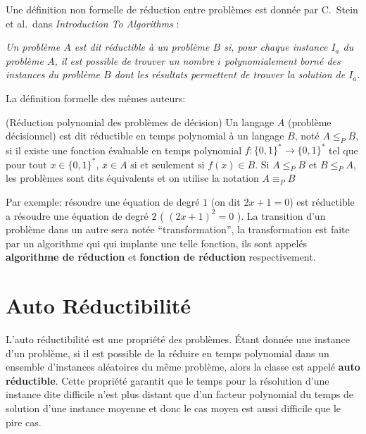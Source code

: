 Une définition non formelle de réduction entre problèmes est donnée par C.~Stein et al.~dans {\em Introduction To
  Algorithms} \cite{stein2001introduction}: 

{\em Un problème $A$ est dit réductible à un problème $B$ si, pour chaque instance $I_a$ du problème $A$, il est possible de trouver 
un nombre $i$ polynomialement borné des instances
du problème $B$ dont les résultats permettent de trouver la solution de $I_a$.}

La définition formelle des mêmes auteurs:

\begin{definition} (Réduction polynomial des problèmes de décision)
Un langage $A$ (pro\-blè\-me dé\-ci\-sion\-nel) est dit réductible en temps polynomial à un langage $B$, noté $A \leq_P B$, si il existe une fonction évaluable en 
temps polynomial $f:\{0,1\}^*\to\{0,1\}^*$ tel que pour tout $x\in\{0,1\}^*$, $x\in A \text{ si et seulement si } f(x) \in B$. Si $A\leq_PB$ et $B\leq_PA$,
les problèmes sont dits équivalents et on utilise la notation $A\equiv_P B$
%
\end{definition}

Par exemple: résoudre une équation de degré $1$ (on dit $2x+1=0$) est réductible a résoudre une équation de degré $2$ ( $(2x+1)^2 = 0$ ).
La transition d'un problème dans un autre sera notée ``transformation'', la transformation est faite par un algorithme qui qui implante une 
telle fonction, ils sont appelés \textbf{algorithme de réduction} et \textbf{fonction de réduction} respectivement.


\section{Auto Réductibilité}	
	\label{sec:autored}
	L'auto réductibilité est une propriété des problèmes. Étant donnée une instance d'un problème, si il est possible 
	de la réduire en temps polynomial dans un ensemble d'instances aléatoires du même problème, alors la classe est appelé 
	\textbf{auto réductible}. Cette propriété garantit que le temps pour la résolution d'une instance dite difficile n'est plus distant
	que d'un facteur polynomial du temps de solution d'une instance moyenne et donc le cas moyen est aussi difficile que le pire cas.

